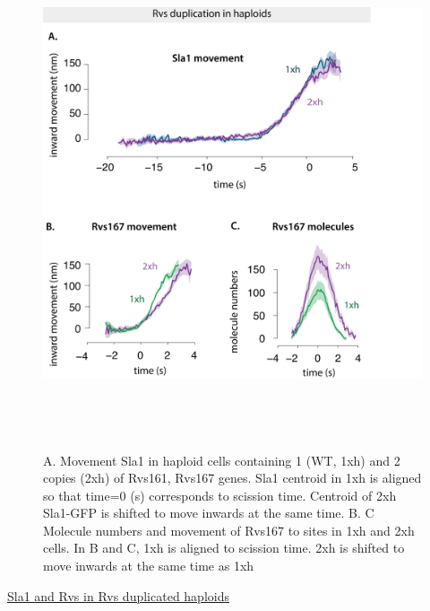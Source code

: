	




				\begin{figure}[H]
	\centering
	\includegraphics[width=15cm,height=15cm,keepaspectratio]{figures/results_final/rvs_haploid4}
	\vspace*{2mm}
	\caption[Overexpression of Rvs in haploid cells]
	{A. Movement Sla1 in haploid cells containing 1 (WT, 1xh) and 2 copies (2xh) of Rvs161, Rvs167 genes. Sla1 centroid in 1xh is aligned so that time=0 (s) corresponds to scission time. Centroid of 2xh Sla1-GFP is shifted to move inwards at the same time. 
		B. C Molecule numbers and movement of Rvs167 to sites in 1xh and 2xh cells. In B and C, 1xh is aligned to scission time. 2xh is shifted to move inwards at the same time as 1xh
		\label{fig_rvshaploid}}
	
\end{figure}
 \underline{Sla1 and Rvs in Rvs duplicated haploids}
 
